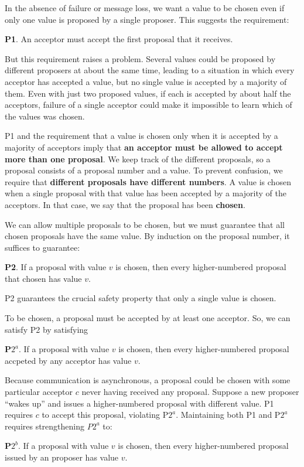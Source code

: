 \documentclass[11pt]{article}
\begin{document}
In the absence of failure or message loss, we want a value to be chosen even if only one value is
proposed by a single proposer. This suggests the requirement:

\textbf{P1}. An acceptor must accept the first proposal that it receives.

But this requirement raises a problem. Several values could be proposed by different proposers at
about the same time, leading to a situation in which every acceptor has accepted a value, but no
single value is accepted by a majority of them. Even with just two proposed values, if each is
accepted by about half the acceptors, failure of a single acceptor could make it impossible to learn
which of the values was chosen.

P1 and the requirement that a value is chosen only when it is accepted by a majority of acceptors
imply that \textbf{an acceptor must be allowed to accept more than one proposal}. We keep track of the
different proposals, so a proposal consists of a proposal number and a value. To prevent confusion, we
require that \textbf{different proposals have different numbers}. A value is chosen when a single proposal with
that value has been accepted by a majority of the acceptors. In that case, we say that the proposal
has been \textbf{chosen}.

We can allow multiple proposals to be chosen, but we must guarantee that all chosen proposals have the
same value. By induction on the proposal number, it suffices to guarantee:

\textbf{P2}. If a proposal with value \(v\) is chosen, then every higher-numbered proposal that chosen has
value \(v\).

P2 guarantees the crucial safety property that only a single value is chosen.

To be chosen, a proposal must be accepted by at least one acceptor. So, we can satisfy P2 by
satisfying

\textbf{P\(2^a\)}. If a proposal with value \(v\) is chosen, then every higher-numbered proposal accpeted by
any acceptor has value \(v\).

Because communication is asynchronous, a proposal could be chosen with some particular acceptor \(c\)
never having received any proposal. Suppose a new proposer ``wakes up'' and issues a higher-numbered
proposal with different value. P1 requires \(c\) to accept this proposal, violating P\(2^a\).
Maintaining both P1 and P\(2^a\) requires strengthening \(P2^a\) to:

\textbf{P\(2^b\)}. If a proposal with value \(v\) is chosen, then every higher-numbered proposal issued by an
proposer has value \(v\).
\end{document}
